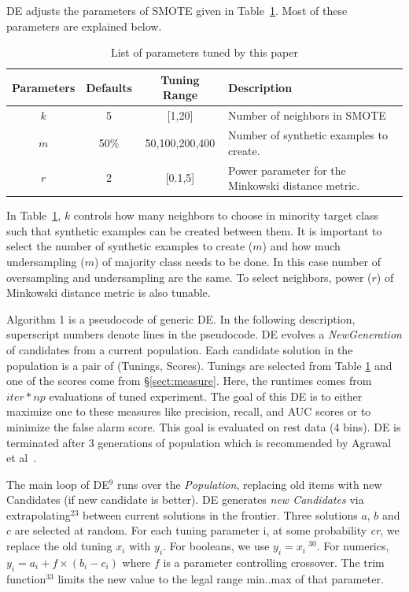 \documentclass[10pt,conference]{IEEEtran}
\theoremstyle{break}
\theoremstyle{break}
\newcommand{\tion}[1]{{\S}\ref{sect:#1}}
\begin{document}
DE  adjusts the parameters of SMOTE given in
Table~\ref{tb:tuned}. Most of these parameters are explained below. 

\begin{table}[!htbp]
    \begin{center}
\scriptsize
\begin{tabular}{|c|c|c|p{3.5cm}|}
        \hline 
        \textbf{Parameters} & \textbf{Defaults} & \textbf{Tuning Range} & \textbf{Description}\\
        \hline
        $k$ & 5 & [1,20] & Number of neighbors in SMOTE \\ 
        \hline
       $m$ & 50\% & {50,100,200,400} & Number of synthetic examples to create. \\ 
        \hline
        $r$ & 2 & [0.1,5] & Power parameter for the Minkowski distance metric.\\

        \hline
\end{tabular}
\end{center}
\caption{List of parameters tuned by this paper}
\label{tb:tuned}
\vspace{-0.4cm}
\end{table}
 
In Table~\ref{tb:tuned}, $k$ controls how many neighbors to choose in minority target class such that synthetic examples can be created between them. It is important to select the number of synthetic examples to create ($m$) and how much undersampling ($m$) of majority class needs to be done. In this case number of oversampling and undersampling are the same. To select neighbors, power ($r$) of Minkowski distance metric is also tunable.

Algorithm 1 is a pseudocode of generic DE. In the following description,
superscript numbers denote lines in the pseudocode. DE evolves a \textit{NewGeneration} of
candidates from a current population.  Each candidate solution in the population is a pair of
(Tunings, Scores). Tunings are selected from Table \ref{tb:tuned} and one of the scores
come from \tion{measure}. Here, the runtimes comes from $\mathit{iter} * np $ evaluations of tuned experiment. The goal of this DE is to either maximize one to these measures like precision, recall, and AUC scores or to minimize the false alarm score. This goal is evaluated on rest data (4 bins). DE is terminated after 3 generations of population which is recommended by Agrawal et al~\cite{agrawal2016wrong}.

The main loop of DE$^{9}$ runs over the \textit{Population}, replacing old items with new Candidates (if new candidate is better).
DE generates \textit{new Candidates} via 
extrapolating$^{23}$ between current solutions in the frontier. Three solutions $a$, $b$ and $c$ are
selected at random. For each tuning parameter i, at some probability \textit{cr}, we
replace the old tuning $x_i$ with $y_i$. For booleans, we use $y_i = x_i\ ^{30}$. For numerics, $y_i = a_i + f \times (b_i - c_i)$ where $f$ is a
parameter controlling crossover. The trim function$^{33}$ limits the new value
to the legal range min..max of that parameter.
\end{document}
